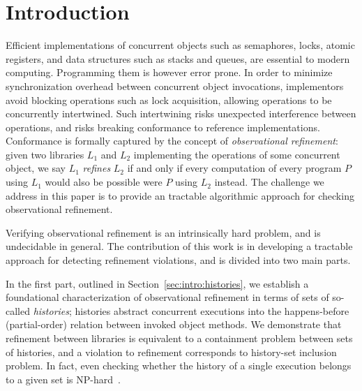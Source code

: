 \section{Introduction}

Efficient implementations of concurrent objects such as semaphores, locks,
atomic registers, and data structures such as stacks and queues, are essential
to modern computing. Programming them is however error prone. In order to
minimize synchronization overhead between concurrent object invocations,
implementors avoid blocking operations such as lock acquisition, allowing
operations to be concurrently intertwined. Such intertwining risks unexpected
interference between operations, and risks breaking conformance to reference
implementations. Conformance is formally captured by the concept of
\emph{observational refinement}: given two libraries $L_1$ and $L_2$
implementing the operations of some concurrent object, we say $L_1$
\emph{refines} $L_2$ if and only if every computation of every program $P$
using $L_1$ would also be possible were $P$ using $L_2$ instead. The challenge
we address in this paper is to provide an tractable algorithmic approach for
checking observational refinement.

Verifying observational refinement is an intrinsically hard problem, and is
undecidable in general. The contribution of this work is in developing a
tractable approach for detecting refinement violations, and is divided into two
main parts.

In the first part, outlined in Section~\ref{sec:intro:histories}, we establish
a foundational characterization of observational refinement in terms of sets of
so-called \emph{histories}; histories abstract concurrent executions into the
happens-before (partial-order) relation between invoked object methods. We
demonstrate that refinement between libraries is equivalent to a containment
problem between sets of histories, and a violation to refinement corresponds to
history-set inclusion problem. In fact, even checking whether the history of a
single execution belongs to a given set is
NP-hard~\cite{journals/siamcomp/GibbonsK97}.


